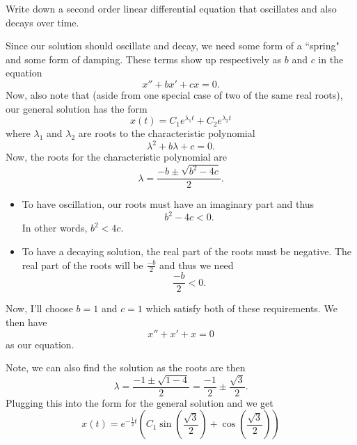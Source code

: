 \documentclass[12pt]{article} %
\begin{document}
\newpage

\begin{problem}
Write down a second order linear differential equation that oscillates and also decays over time.
\end{problem}
\begin{solution}
Since our solution should oscillate and decay, we need some form of a ``spring" and some form of damping.  These terms show up respectively as $b$ and $c$ in the equation
\[
x''+bx'+cx=0.
\]
Now, also note that (aside from one special case of two of the same real roots), our general solution has the form
\[
x(t)=C_1 e^{\lambda_1 t}+C_2e^{\lambda_2 t}
\]
where $\lambda_1$ and $\lambda_2$ are roots to the characteristic polynomial
\[
\lambda^2+b\lambda + c =0.
\]
Now, the roots for the characteristic polynomial are
\[
\lambda = \frac{-b \pm \sqrt{b^2-4c}}{2}.
\]
\begin{itemize}
    \item To have oscillation, our roots must have an imaginary part and thus 
    \[
    b^2-4c<0.
    \]
    In other words, $b^2<4c.$
    \item To have a decaying solution, the real part of the roots must be negative. The real part of the roots will be $\frac{-b}{2}$ and thus we need
    \[
    \frac{-b}{2}<0.
    \]
\end{itemize}
Now, I'll choose $b=1$ and $c=1$ which satisfy both of these requirements. We then have
\[
x''+x'+x=0
\]
as our equation.

Note, we can also find the solution as the roots are then
\[
\lambda = \frac{-1\pm \sqrt{1-4}}{2}=\frac{-1}{2}\pm \frac{\sqrt{3}}{2}.
\]
Plugging this into the form for the general solution and we get
\[
x(t)=e^{-\frac{1}{2}t}\left(C_1 \sin\left(\frac{\sqrt{3}}{2}\right) + \cos\left(\frac{\sqrt{3}}{2}\right)\right)
\]
\end{solution}

\newpage
\end{document}
